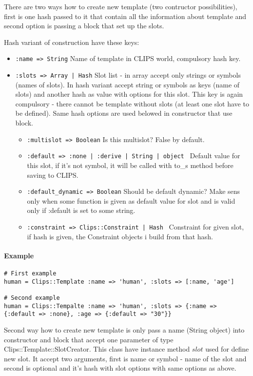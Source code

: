 \documentclass[a4paper,10pt]{article}
\begin{document}
There are two ways how to create new template (two contructor possibilities), first is one hash passed to it that contain all the information about template and second option is passing a block that set up the slots.

Hash variant of construction have these keys:
\begin{itemize}
 \item \texttt{:name => String} Name of template in CLIPS world, compulsory hash key.
 \item \texttt{:slots => Array | Hash} Slot list - in array accept only strings or symbols (names of slots). In hash variant accept string or symbols as keys (name of slots) and another hash as value with options for this slot. This key is again compulsory - there cannot be template without slots (at least one slot have to be defined). Same hash options are used belowed in constructor that use block.
	\begin{itemize}
	 \item \texttt{:multislot => Boolean} Is this multislot? False by default.
	 \item \texttt{:default => :none | :derive | String | object } Default value for this slot, if it's not symbol, it will be called with to\_s method before saving to CLIPS.
	 \item \texttt{:default\_dynamic => Boolean} Should be default dynamic? Make sens only when some function is given as default value for slot and is valid only if :default is set to some string.
	 \item \texttt{:constraint => Clips::Constraint | Hash } Constraint for given slot, if hash is given, the Constraint objects i build from that hash.
	\end{itemize}
\end{itemize}

\paragraph{Example}
\begin{verbatim}
# First example
human = Clips::Template :name => 'human', :slots => [:name, 'age']

# Second example
human = Clips::Tempalte :name => 'human', :slots => {:name => {:default => :none}, :age => {:default => "30"}}
\end{verbatim}

Second way how to create new template is only pass a name (String object) into constructor and block that accept one parameter of type Clips::Template::SlotCreator. This class have instance method $slot$ used for define new slot. It accept two arguments, first is name or symbol - name of the slot and second is optional and it's hash with slot options with same options as above.
\end{document}
